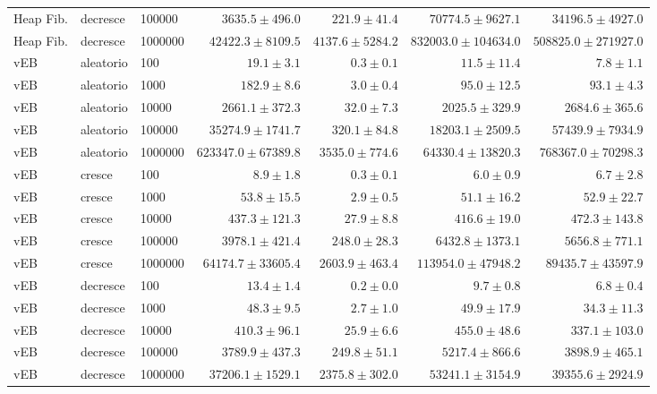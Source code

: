 \begin{table}[htbp]
\begin{tabular}{lllrrrr}
    Heap Fib. & decresce & 100000 & $3635.5 \pm 496.0$ & $221.9 \pm 41.4$ & $70774.5 \pm 9627.1$ & $34196.5 \pm 4927.0$ \\
    Heap Fib. & decresce & 1000000 & $42422.3 \pm 8109.5$ & $4137.6 \pm 5284.2$ & $832003.0 \pm 104634.0$ & $508825.0 \pm 271927.0$ \\
    \midrule
    vEB & aleatorio & 100 & $19.1 \pm 3.1$ & $0.3 \pm 0.1$ & $11.5 \pm 11.4$ & $7.8 \pm 1.1$ \\
    vEB & aleatorio & 1000 & $182.9 \pm 8.6$ & $3.0 \pm 0.4$ & $95.0 \pm 12.5$ & $93.1 \pm 4.3$ \\
    vEB & aleatorio & 10000 & $2661.1 \pm 372.3$ & $32.0 \pm 7.3$ & $2025.5 \pm 329.9$ & $2684.6 \pm 365.6$ \\
    vEB & aleatorio & 100000 & $35274.9 \pm 1741.7$ & $320.1 \pm 84.8$ & $18203.1 \pm 2509.5$ & $57439.9 \pm 7934.9$ \\
    vEB & aleatorio & 1000000 & $623347.0 \pm 67389.8$ & $3535.0 \pm 774.6$ & $64330.4 \pm 13820.3$ & $768367.0 \pm 70298.3$ \\
    \midrule
    vEB & cresce & 100 & $8.9 \pm 1.8$ & $0.3 \pm 0.1$ & $6.0 \pm 0.9$ & $6.7 \pm 2.8$ \\
    vEB & cresce & 1000 & $53.8 \pm 15.5$ & $2.9 \pm 0.5$ & $51.1 \pm 16.2$ & $52.9 \pm 22.7$ \\
    vEB & cresce & 10000 & $437.3 \pm 121.3$ & $27.9 \pm 8.8$ & $416.6 \pm 19.0$ & $472.3 \pm 143.8$ \\
    vEB & cresce & 100000 & $3978.1 \pm 421.4$ & $248.0 \pm 28.3$ & $6432.8 \pm 1373.1$ & $5656.8 \pm 771.1$ \\
    vEB & cresce & 1000000 & $64174.7 \pm 33605.4$ & $2603.9 \pm 463.4$ & $113954.0 \pm 47948.2$ & $89435.7 \pm 43597.9$ \\
    \midrule
    vEB & decresce & 100 & $13.4 \pm 1.4$ & $0.2 \pm 0.0$ & $9.7 \pm 0.8$ & $6.8 \pm 0.4$ \\
    vEB & decresce & 1000 & $48.3 \pm 9.5$ & $2.7 \pm 1.0$ & $49.9 \pm 17.9$ & $34.3 \pm 11.3$ \\
    vEB & decresce & 10000 & $410.3 \pm 96.1$ & $25.9 \pm 6.6$ & $455.0 \pm 48.6$ & $337.1 \pm 103.0$ \\
    vEB & decresce & 100000 & $3789.9 \pm 437.3$ & $249.8 \pm 51.1$ & $5217.4 \pm 866.6$ & $3898.9 \pm 465.1$ \\
    vEB & decresce & 1000000 & $37206.1 \pm 1529.1$ & $2375.8 \pm 302.0$ & $53241.1 \pm 3154.9$ & $39355.6 \pm 2924.9$ \\
    \midrule
    \bottomrule
  \end{tabular}
\end{table}
